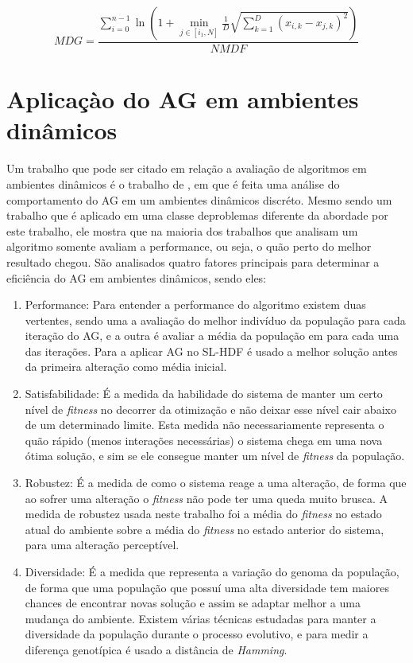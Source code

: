 \begin{equation}
\label{eq:genotypic}
MDG = \frac{\sum_{i=0}^{n-1} \ln \left(1 + \min_{j \in [i_1,N]} \frac{1}{D} \sqrt{ \sum\limits_{k=1}^{D} (x_{i,k} - x_{j,k})^2}\right)}{NMDF}
\end{equation}

\section{Aplicaçào do AG em ambientes dinâmicos}
\label{sec:ag_behaviour}

Um trabalho que pode ser citado em relação a avaliação de algoritmos em ambientes dinâmicos é o trabalho de \cite{rand2005measurements}, em que é feita uma análise do comportamento do AG em um ambientes dinâmicos discréto. Mesmo sendo um trabalho que é aplicado em uma classe deproblemas diferente da abordade por este trabalho, ele mostra que na maioria dos trabalhos que analisam um algoritmo somente avaliam a performance, ou seja, o quão perto do melhor resultado chegou. São analisados quatro fatores principais para determinar a eficiência do AG em ambientes dinâmicos, sendo eles:

\begin{enumerate}
	\item Performance: Para entender a performance do algoritmo existem duas vertentes, sendo uma a avaliação do melhor indivíduo da população para cada iteração do AG, e a outra é avaliar a média da população em para cada uma das iterações. Para a aplicar AG no SL-HDF é usado a melhor solução antes da primeira alteração como média inicial.
	
	\item Satisfabilidade: É a medida da habilidade do sistema de manter um certo nível de \textit{fitness} no decorrer da otimização e não deixar esse nível cair abaixo de um determinado limite. Esta medida não necessariamente representa o quão rápido (menos interações necessárias) o sistema chega em uma nova ótima solução, e sim se ele consegue manter um nível de \textit{fitness} da população.
	
	\item Robustez: É a medida de como o sistema reage a uma alteração, de forma que ao sofrer uma alteração o \textit{fitness} não pode ter uma queda muito brusca. A medida de robustez usada neste trabalho foi a média do \textit{fitness} no estado atual do ambiente sobre a média do \textit{fitness} no estado anterior do sistema, para uma alteração perceptível.
	
	\item Diversidade: É a medida que representa a variação do genoma da população, de forma que uma população que possuí uma alta diversidade tem maiores chances de encontrar novas solução e assim se adaptar melhor a uma mudança do ambiente. Existem várias técnicas estudadas para manter a diversidade da população durante o processo evolutivo, e para medir a diferença genotípica é usado a distância de \textit{Hamming}.
\end{enumerate}

